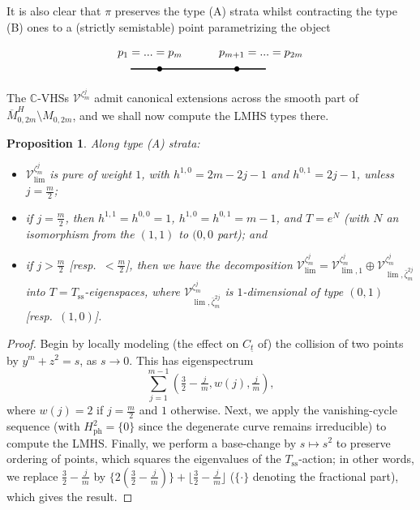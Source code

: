 \documentclass[12pt,letterpaper,english]{amsart}
\numberwithin{equation}{section}
\numberwithin{figure}{section}
\theoremstyle{plain}
\theoremstyle{remark}
\theoremstyle{definition}
\theoremstyle{definition}
\theoremstyle{plain}
\theoremstyle{plain}
\newtheorem{prop}[equation]{Proposition}
\theoremstyle{plain}
\theoremstyle{plain}
\theoremstyle{definition}
\def\ut{\underline{t}}
\def\CC{\mathbb{C}}
\def\ut{\underline{t}}
\def\V{\mathcal{V}}
\def\sm{\setminus}
\theoremstyle{definition}
\begin{document}
\noindent It is also clear that $\pi$ preserves the type (A) strata whilst contracting the type (B) ones to a (strictly semistable) point parametrizing the object
\begin{center}
\begin{equation*}
\begin{tikzpicture}[scale=3]
\draw[-,line width=1.0pt] (-0.5,0) -- (0.9,0);
\fill (0.6,0) circle (0.75pt);
\fill (-0.2,0) circle (0.75pt);
\node at (-0.3,0.15) {$p_1=...=p_m$};
\node at (0.85,0.15) {$p_{m+1}=...=p_{2m}$};
\end{tikzpicture}
\end{equation*}
\end{center}

\noindent The $\CC$-VHSs $\V^{\zeta_m^j}$ admit canonical extensions across the smooth part of $\overline{M}^H_{0,2m}\sm M_{0,2m}$, and we shall now compute the LMHS types there.

\begin{prop}\label{D5}
Along type \textup{(}A\textup{)} strata:
\begin{itemize}[leftmargin=0.5cm]
\item $\V_{\lim}^{\zeta_m^j}$ is pure of weight $1$, with $h^{1,0}=2m-2j-1$ and $h^{0,1}=2j-1$, unless $j=\tfrac{m}{2}$;
\item if $j=\tfrac{m}{2}$, then $h^{1,1}=h^{0,0}=1$, $h^{1,0}=h^{0,1}=m-1$, and $T=e^N$ \textup{(}with $N$ an isomorphism from the $(1,1)$ to $(0,0$ part\textup{)}; and
\item if $j>\tfrac{m}{2}$ \textup{[}resp.~$<\tfrac{m}{2}$\textup{]}, then we have the decomposition $\V^{\zeta_m^j}_{\lim}=\V_{\lim,1}^{\zeta_m^j}\oplus \V^{\zeta_m^j}_{\lim,\bar{\zeta}_m^{2j}}$ into $T=T_{\text{ss}}$-eigenspaces, where $\V^{\zeta_m^j}_{\lim,\bar{\zeta}_m^{2j}}$ is $1$-dimensional of type $(0,1)$ \textup{[}resp.~$(1,0)$\textup{]}.
\end{itemize}
\end{prop}
\begin{proof}
Begin by locally modeling (the effect on $C_{\ut}$ of) the collision of two points by $y^m+z^2=s$, as $s\to 0$. This has eigenspectrum
$$\textstyle\sum_{j=1}^{m-1}(\tfrac{3}{2}-\tfrac{j}{m},w(j),\tfrac{j}{m}),$$
where $w(j)=2$ if $j=\tfrac{m}{2}$ and $1$ otherwise.  Next, we apply the vanishing-cycle sequence (with $H^2_{\text{ph}}=\{0\}$ since the degenerate curve remains irreducible) to compute the LMHS. Finally, we perform a base-change by $s\mapsto s^2$ to preserve ordering of points, which squares the eigenvalues of the $T_{\text{ss}}$-action; in other words, we replace $\tfrac{3}{2}-\tfrac{j}{m}$ by $\{2(\tfrac{3}{2}-\tfrac{j}{m})\}+\lfloor \tfrac{3}{2}-\tfrac{j}{m}\rfloor$ ($\{\cdot\}$ denoting the fractional part), which gives the result.
\end{proof}
\end{document}
